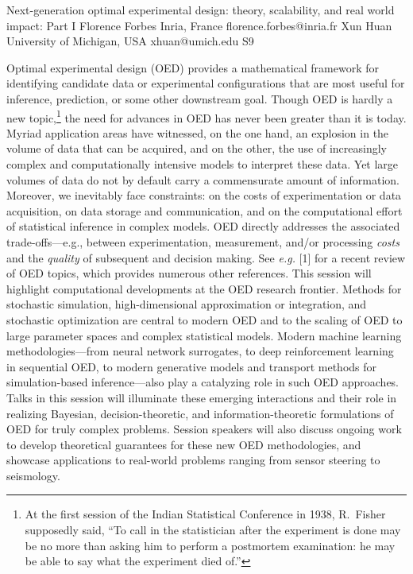 \begin{session}
 {Next-generation optimal experimental design: theory, scalability, and real world impact: Part I}%
 {Florence Forbes}%
 {Inria, France}%
 {florence.forbes@inria.fr}%
 {Xun Huan}%
 {University of Michigan, USA}%
 {xhuan@umich.edu}%
 {S9}%
 {}%

 Optimal experimental design (OED) provides a mathematical framework for identifying candidate data or experimental configurations that are most useful for inference, prediction, or some other downstream goal. Though OED is hardly a new topic,\footnote{At the first session of the Indian Statistical Conference in 1938, R.\ Fisher supposedly said, ``To call in the statistician after the experiment is done may be no more than asking him to perform a postmortem examination: he may be able to say what the experiment died of.''} the need for advances in OED has never been greater than it is today. Myriad application areas have witnessed, on the one hand, an explosion in the volume of data that can be acquired, and on the other, the use of increasingly complex and computationally intensive models to interpret these data. Yet large volumes of data do not by default carry a commensurate amount of information. Moreover, we inevitably face constraints: on the costs of experimentation or data acquisition, on data storage and communication, and on the computational effort of statistical inference in complex models. OED directly addresses the associated trade-offs---e.g., between experimentation, measurement, and/or processing \textit{costs} and
 the \textit{quality} of subsequent and decision making. See {\it e.g.} [1] for a recent review of OED topics, which provides numerous other references.
 This session will highlight computational developments at the OED research frontier. Methods for stochastic simulation, high-dimensional approximation or integration, and stochastic optimization are central to modern OED and to the scaling of OED to large parameter spaces and complex statistical models. Modern machine learning methodologies---from neural network surrogates, to deep reinforcement learning in sequential OED, to modern generative models and transport methods for simulation-based inference---also play a catalyzing role in such OED approaches. Talks in this session will illuminate these emerging interactions and their role in realizing Bayesian, decision-theoretic, and information-theoretic formulations of OED for truly complex problems. Session speakers will also discuss ongoing work to develop theoretical guarantees for these new OED methodologies, and showcase applications to real-world problems ranging from sensor steering to seismology.

\end{session}
